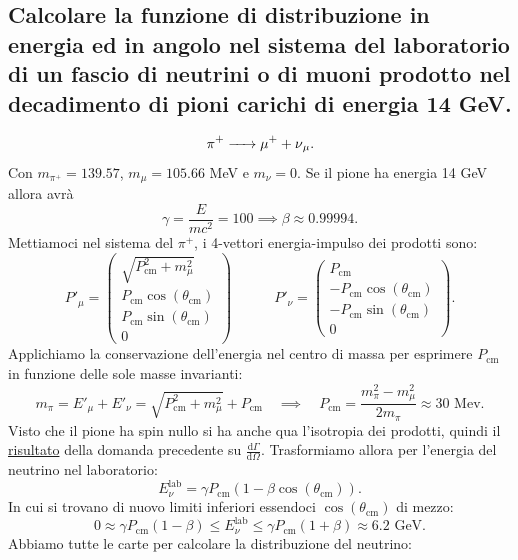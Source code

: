 \subsection[\hspace{2mm} Decadimento del pione carico in muone e neutrino muonico]{Calcolare la funzione di distribuzione in energia ed in angolo nel sistema del laboratorio di un fascio di neutrini o di muoni prodotto nel decadimento di pioni carichi di energia 14 GeV.}
\[
	\ce{\ce{\pi^+} -> \ce{\mu^+} + \ce{\nu_{\mu}}}
.\] 
Con  $m_{\pi^+} = 139.57$, $m_{\mu}=105.66$ MeV e $m_{\nu}=0$. Se il pione ha energia 14 GeV allora avrà
\[
\gamma = \frac{E}{mc^2} = 100 \implies \beta \approx 0.99994
.\] 
Mettiamoci nel sistema del $\pi^+$, i 4-vettori energia-impulso dei prodotti sono:
\[
P'_{\mu} =  
\begin{pmatrix}
	\sqrt{P_{\text{cm}}^2+m_{\mu}^2}  \\
	P_{\text{cm}}\cos\left( \theta_{\text{cm}} \right) \\
	P_{\text{cm}}\sin\left( \theta_{\text{cm}} \right) \\
	0
\end{pmatrix} \quad \quad \quad 
P'_{\nu} = 
\begin{pmatrix} 
	P_{\text{cm}} \\
	-P_{\text{cm}}\cos\left( \theta_{\text{cm}} \right) \\
	-P_{\text{cm}}\sin\left( \theta_{\text{cm}} \right) \\
	0
\end{pmatrix} 
.\] 
Applichiamo la conservazione dell'energia nel centro di massa per esprimere $P_{\text{cm}}$ in funzione delle sole masse invarianti:
\[
	m_{\pi} = E'_{\mu} + E'_{\nu} =
	\sqrt{P_{\text{cm}}^2 + m_{\mu}^2} + P_{\text{cm}} \quad \implies
	\quad P_{\text{cm}} = \frac{m_{\pi}^2 - m_{\mu}^2}{2m_{\pi}} \approx 30\text{ Mev}
.\]
Visto che il pione ha spin nullo si ha anche qua l'isotropia dei prodotti, quindi il \hyperref[eq:isotropia]{risultato} della domanda precedente su $\frac{\text{d}\Gamma}{\text{d}\Omega}$.
Trasformiamo allora per l'energia del neutrino nel laboratorio:
\[
	E_{\nu}^{\text{lab}}=\gamma P_{\text{cm}} \left(1-\beta\cos\left( \theta_{\text{cm}}\right)\right) 
.\] 
In cui si trovano di nuovo limiti inferiori essendoci $\cos\left( \theta_{\text{cm}} \right) $ di mezzo:
\[
	0 \approx \gamma P_{\text{cm}}\left( 1-\beta \right) \le E_{\nu}^{\text{lab}}\le \gamma P_{\text{cm}}\left( 1+\beta \right) \approx 6.2 \text{ GeV}
.\] 
Abbiamo tutte le carte per calcolare la distribuzione del neutrino:
